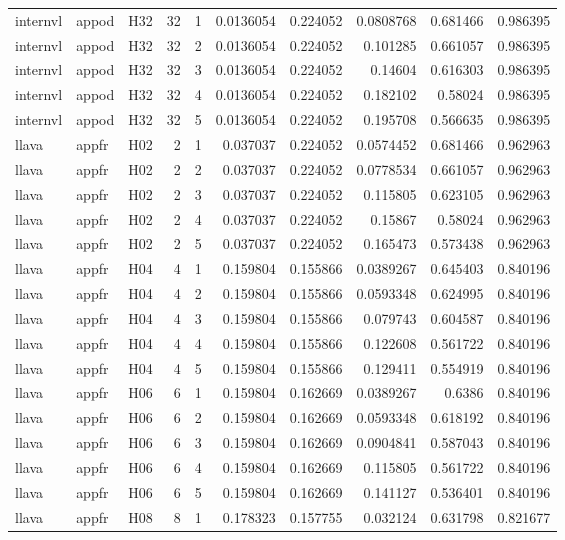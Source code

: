 \begin{longtable}{lllrrrrrrr}
internvl & appod & H32 & 32 & 1 & 0.0136054 & 0.224052 & 0.0808768 & 0.681466 & 0.986395 \\
internvl & appod & H32 & 32 & 2 & 0.0136054 & 0.224052 & 0.101285 & 0.661057 & 0.986395 \\
internvl & appod & H32 & 32 & 3 & 0.0136054 & 0.224052 & 0.14604 & 0.616303 & 0.986395 \\
internvl & appod & H32 & 32 & 4 & 0.0136054 & 0.224052 & 0.182102 & 0.58024 & 0.986395 \\
internvl & appod & H32 & 32 & 5 & 0.0136054 & 0.224052 & 0.195708 & 0.566635 & 0.986395 \\
llava & appfr & H02 & 2 & 1 & 0.037037 & 0.224052 & 0.0574452 & 0.681466 & 0.962963 \\
llava & appfr & H02 & 2 & 2 & 0.037037 & 0.224052 & 0.0778534 & 0.661057 & 0.962963 \\
llava & appfr & H02 & 2 & 3 & 0.037037 & 0.224052 & 0.115805 & 0.623105 & 0.962963 \\
llava & appfr & H02 & 2 & 4 & 0.037037 & 0.224052 & 0.15867 & 0.58024 & 0.962963 \\
llava & appfr & H02 & 2 & 5 & 0.037037 & 0.224052 & 0.165473 & 0.573438 & 0.962963 \\
llava & appfr & H04 & 4 & 1 & 0.159804 & 0.155866 & 0.0389267 & 0.645403 & 0.840196 \\
llava & appfr & H04 & 4 & 2 & 0.159804 & 0.155866 & 0.0593348 & 0.624995 & 0.840196 \\
llava & appfr & H04 & 4 & 3 & 0.159804 & 0.155866 & 0.079743 & 0.604587 & 0.840196 \\
llava & appfr & H04 & 4 & 4 & 0.159804 & 0.155866 & 0.122608 & 0.561722 & 0.840196 \\
llava & appfr & H04 & 4 & 5 & 0.159804 & 0.155866 & 0.129411 & 0.554919 & 0.840196 \\
llava & appfr & H06 & 6 & 1 & 0.159804 & 0.162669 & 0.0389267 & 0.6386 & 0.840196 \\
llava & appfr & H06 & 6 & 2 & 0.159804 & 0.162669 & 0.0593348 & 0.618192 & 0.840196 \\
llava & appfr & H06 & 6 & 3 & 0.159804 & 0.162669 & 0.0904841 & 0.587043 & 0.840196 \\
llava & appfr & H06 & 6 & 4 & 0.159804 & 0.162669 & 0.115805 & 0.561722 & 0.840196 \\
llava & appfr & H06 & 6 & 5 & 0.159804 & 0.162669 & 0.141127 & 0.536401 & 0.840196 \\
llava & appfr & H08 & 8 & 1 & 0.178323 & 0.157755 & 0.032124 & 0.631798 & 0.821677 \\

\end{longtable}
